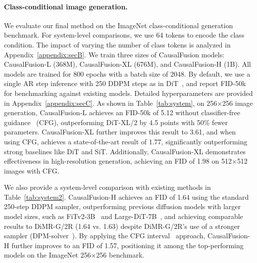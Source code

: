 \paragraph{Class-conditional image generation.}
\label{sec:system}
We evaluate our final method on the ImageNet class-conditional generation benchmark. For system-level comparisons, we use 64 tokens to encode the class condition. The impact of varying the number of class tokens is analyzed in Appendix~\ref{appendix:secB}. We train three sizes of CausalFusion models: CausalFusion-L (368M), CausalFusion-XL (676M), and CausalFusion-H (1B). All models are trained for 800 epochs with a batch size of 2048. By default, we use a single AR step inference with 250 DDPM steps as in DiT~\cite{dit}, and report FID-50k for benchmarking against existing models. Detailed hyperparameters are provided in Appendix~\ref{appendix:secC}. As shown in Table~\ref{tab:system}, on 256$\times$256 image generation, CausalFusion-L achieves an FID-50k of 5.12 without classifier-free guidance~\cite{ho2022classifier} (CFG), outperforming DiT-XL/2 by 4.5 points with 50\% fewer parameters. CausalFusion-XL further improves this result to 3.61, and when using CFG, achieves a state-of-the-art result of 1.77, significantly outperforming strong baselines like DiT and SiT. Additionally, CausalFusion-XL demonstrates effectiveness in high-resolution generation, achieving an FID of 1.98 on 512$\times$512 images with CFG.

We also provide a system-level comparison with existing methods in Table~\ref{tab:system2}. CausalFusion-H achieves an FID of 1.64 using the standard 250-step DDPM sampler, outperforming previous diffusion models with larger model sizes, such as FiTv2-3B~\cite{wang2024fitv2} and Large-DiT-7B~\cite{gao2024lumina}, and achieving comparable results to DiMR-G/2R (1.64 vs. 1.63) despite DiMR-G/2R’s use of a stronger sampler (DPM-solver~\cite{dpm}). By applying the CFG interval~\cite{kynkaanniemi2024applying} approach, CausalFusion-H further improves to an FID of 1.57, positioning it among the top-performing models on the ImageNet 256$\times$256 benchmark.


